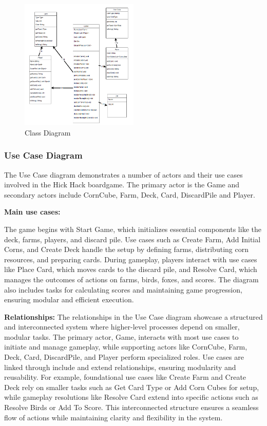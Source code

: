 \documentclass[conference]{IEEEtran}
\begin{document}
\begin{figure}[h!]
    \centering
    \includegraphics[width=0.5\textwidth]{img/Class Diagram.png} %
    \caption{Class Diagram}
    \label{fig:class-diagram}
\end{figure}


\subsubsection{Use Case Diagram}



The Use Case diagram demonstrates a number of actors and their use cases involved in the Hick Hack boardgame. The primary actor is the Game and secondary actors include CornCube, Farm, Deck, Card, DiscardPile and Player.

\textbf{Main use cases:}

The game begins with Start Game, which initializes essential components like the deck, farms, players, and discard pile. Use cases such as Create Farm, Add Initial Corns, and Create Deck handle the setup by defining farms, distributing corn resources, and preparing cards. During gameplay, players interact with use cases like Place Card, which moves cards to the discard pile, and Resolve Card, which manages the outcomes of actions on farms, birds, foxes, and scores. The diagram also includes tasks for calculating scores and maintaining game progression, ensuring modular and efficient execution.

\textbf{Relationships:}
The relationships in the Use Case diagram showcase a structured and interconnected system where higher-level processes depend on smaller, modular tasks. The primary actor, Game, interacts with most use cases to initiate and manage gameplay, while supporting actors like CornCube, Farm, Deck, Card, DiscardPile, and Player perform specialized roles. Use cases are linked through include and extend relationships, ensuring modularity and reusability. For example, foundational use cases like Create Farm and Create Deck rely on smaller tasks such as Get Card Type or Add Corn Cubes for setup, while gameplay resolutions like Resolve Card extend into specific actions such as Resolve Birds or Add To Score. This interconnected structure ensures a seamless flow of actions while maintaining clarity and flexibility in the system.
\end{document}

